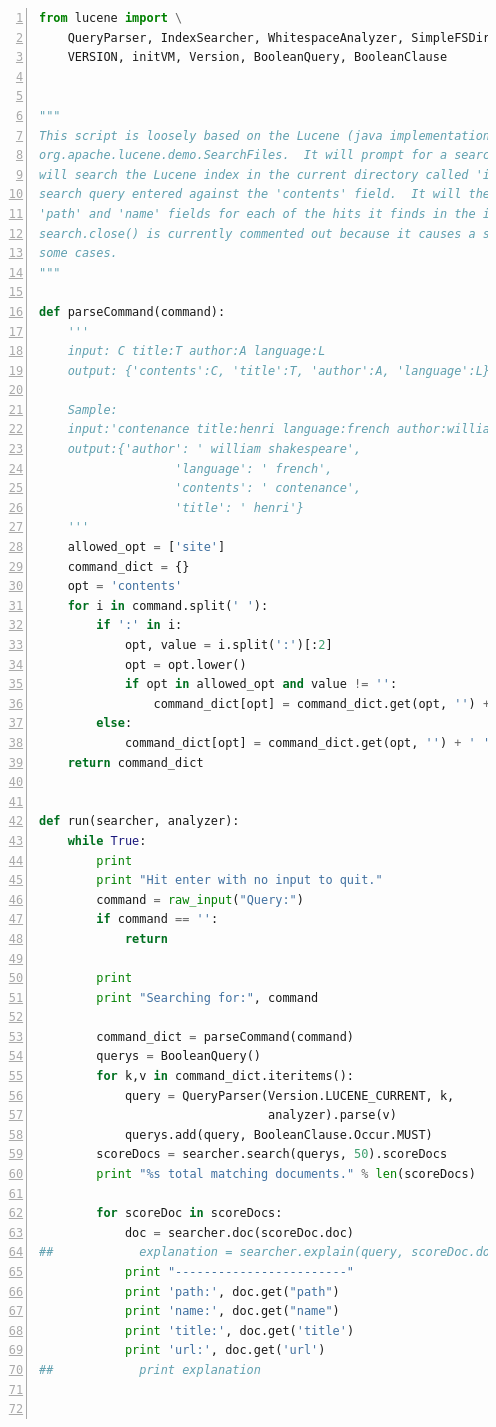 \documentclass{article}
\begin{document}
\begin{lstlisting}[language=python,numbers=left,frame=leftline]
from lucene import \
    QueryParser, IndexSearcher, WhitespaceAnalyzer, SimpleFSDirectory, File, \
    VERSION, initVM, Version, BooleanQuery, BooleanClause


"""
This script is loosely based on the Lucene (java implementation) demo class
org.apache.lucene.demo.SearchFiles.  It will prompt for a search query, then it
will search the Lucene index in the current directory called 'index' for the
search query entered against the 'contents' field.  It will then display the
'path' and 'name' fields for each of the hits it finds in the index.  Note that
search.close() is currently commented out because it causes a stack overflow in
some cases.
"""

def parseCommand(command):
    '''
    input: C title:T author:A language:L
    output: {'contents':C, 'title':T, 'author':A, 'language':L}

    Sample:
    input:'contenance title:henri language:french author:william shakespeare'
    output:{'author': ' william shakespeare',
                   'language': ' french',
                   'contents': ' contenance',
                   'title': ' henri'}
    '''
    allowed_opt = ['site']
    command_dict = {}
    opt = 'contents'
    for i in command.split(' '):
        if ':' in i:
            opt, value = i.split(':')[:2]
            opt = opt.lower()
            if opt in allowed_opt and value != '':
                command_dict[opt] = command_dict.get(opt, '') + ' ' + value
        else:
            command_dict[opt] = command_dict.get(opt, '') + ' ' + i
    return command_dict


def run(searcher, analyzer):
    while True:
        print
        print "Hit enter with no input to quit."
        command = raw_input("Query:")
        if command == '':
            return

        print
        print "Searching for:", command

        command_dict = parseCommand(command)
        querys = BooleanQuery()
        for k,v in command_dict.iteritems():
            query = QueryParser(Version.LUCENE_CURRENT, k,
                                analyzer).parse(v)
            querys.add(query, BooleanClause.Occur.MUST)
        scoreDocs = searcher.search(querys, 50).scoreDocs
        print "%s total matching documents." % len(scoreDocs)

        for scoreDoc in scoreDocs:
            doc = searcher.doc(scoreDoc.doc)
##            explanation = searcher.explain(query, scoreDoc.doc)
            print "------------------------"
            print 'path:', doc.get("path")
            print 'name:', doc.get("name")
            print 'title:', doc.get('title')
            print 'url:', doc.get('url')
##            print explanation



\end{lstlisting}
\end{document}

